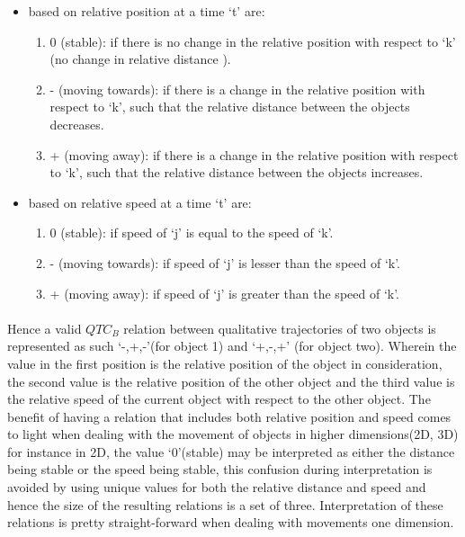 	\begin{itemize}
		\item based on relative position at a time `t' are:
		\begin{enumerate}
			\item 0 (stable): if there is no change in the relative position with respect to `k' (no change in relative distance ).
			
			\item - (moving towards): if there is a change in the relative position with respect to `k', such that the relative distance between the objects decreases.
			
			\item + (moving away): if there is a change in the relative position with respect to `k', such that the relative distance between the objects increases.
		\end{enumerate}
		\item based on relative speed at a time `t' are:
		\begin{enumerate}
			\item 0 (stable): if speed of `j' is equal to the speed of `k'.
			
			\item - (moving towards): if speed of `j' is lesser than the speed of `k'.
			
			\item + (moving away): if speed of `j' is greater than the speed of `k'.
		\end{enumerate}
	\end{itemize}

	\paragraph{}Hence a valid $QTC_B$ relation between qualitative trajectories of two objects is represented as such `{-,+,-}'(for object 1) and `{+,-,+}' (for object two). Wherein the value in the first position is the relative position of the object in consideration, the second value is the relative position of the other object and the third value is the relative speed of the current object with respect to the other object. The benefit of having a relation that includes both relative position and speed comes to light when dealing with the movement of objects in higher dimensions(2D, 3D) for instance in 2D, the value `0'(stable) may be interpreted as either the distance being stable or the speed being stable, this confusion during interpretation is avoided by using unique values for both the relative distance and speed and hence the size of the resulting relations is a set of three. Interpretation of these relations is pretty straight-forward when dealing with movements one dimension.
	
